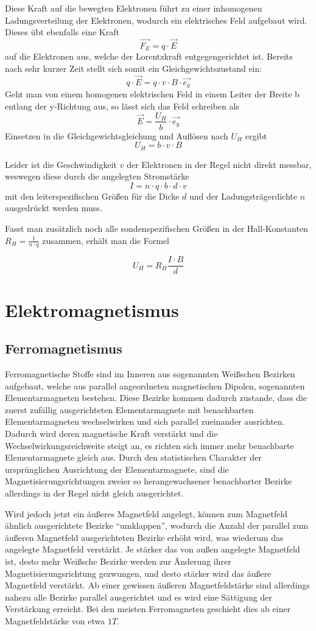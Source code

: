\documentclass[bigchapter,colorback,accentcolor=tud4b,linedtoc,11pt]{tudreport}
\begin{document}
Diese Kraft auf die bewegten Elektronen führt zu einer inhomogenen Ladungsverteilung der Elektronen, wodurch ein elektrisches Feld aufgebaut wird. Dieses übt ebenfalls eine Kraft 
$$\vec{F_E}=q \cdot \vec{E}$$
auf die Elektronen aus, welche der Lorentzkraft entgegengerichtet ist. Bereits nach sehr kurzer Zeit stellt sich somit ein Gleichgewichtszustand ein:
$$q \cdot \vec{E} = q \cdot v  \cdot B \cdot \vec{e_y}$$
Geht man von einem homogenen elektrischen Feld in einem Leiter der Breite b entlang der y-Richtung aus, so lässt sich das Feld schreiben als 
$$\vec{E} = \frac{U_H}{b}\cdot \vec{e_y}$$
Einsetzen in die Gleichgewichtsgleichung und Auflösen nach $U_H$ ergibt
$$U_H = b \cdot v \cdot B$$

Leider ist die Geschwindigkeit $v$ der Elektronen in der Regel nicht direkt messbar, weswegen diese durch die angelegten Stromstärke 
$$I= n\cdot q \cdot b \cdot d \cdot v$$
mit den leiterspezifischen Größen für die Dicke $d$ und der Ladungsträgerdichte $n$ ausgedrückt werden muss.

Fasst man zusätzlich noch alle sondenspezifischen Größen in der Hall-Konstanten $R_H = \frac{1}{n\cdot q}$ zusammen, erhält man die Formel

$$U_H = R_H \frac{I\cdot B}{d}$$

\section{Elektromagnetismus}
\subsection{Ferromagnetismus}

Ferromagnetische Stoffe sind im Inneren aus sogenannten Weißschen Bezirken aufgebaut, welche aus parallel angeordneten magnetischen Dipolen, sogenannten Elementarmagneten bestehen.
Diese Bezirke kommen dadurch zustande, dass die zuerst zufällig ausgerichteten Elementarmagnete mit benachbarten Elementarmagneten wechselwirken und sich parallel zueinander ausrichten. Dadurch wird deren magnetische Kraft verstärkt und die Wechselwirkungsreichweite steigt an, es richten sich immer mehr benachbarte Elementarmagnete gleich aus. Durch den statistischen Charakter der ursprünglichen Ausrichtung der Elementarmagnete, sind die Magnetisierungsrichtungen zweier so herangewachsener benachbarter Bezirke allerdings in der Regel nicht gleich ausgerichtet.

Wird jedoch jetzt ein äußeres Magnetfeld angelegt, können zum Magnetfeld ähnlich ausgerichtete Bezirke "`umklappen"', wodurch die Anzahl der parallel zum äußeren Magnetfeld ausgerichteten Bezirke erhöht wird, was wiederum das angelegte Magnetfeld verstärkt. Je stärker das von außen angelegte Magnetfeld ist, desto mehr Weißsche Bezirke werden zur Änderung ihrer Magnetisierungsrichtung gezwungen, und desto stärker wird das äußere Magnetfeld verstärkt. Ab einer gewissen äußeren Magnetfeldstärke sind allerdings nahezu alle Bezirke parallel ausgerichtet und es wird eine Sättigung der Verstärkung erreicht. Bei den meisten Ferromagneten geschieht dies ab einer Magnetfeldstärke von etwa $1T$.
\end{document}

